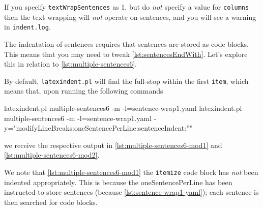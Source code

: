  If you specify \texttt{textWrapSentences} as 1, but do \emph{not} specify a value for
 \texttt{columns} then the text wrapping will \emph{not} operate on sentences, and you
 will see a warning in \texttt{indent.log}.

 \begin{example}
 The indentation of sentences requires that sentences are stored as code blocks. This
 means that you may need to tweak \vref{lst:sentencesEndWith}. Let's explore this in
 relation to \cref{lst:multiple-sentences6}.


 By default, \texttt{latexindent.pl} will find the full-stop within the first
 \texttt{item}, which means that, upon running the following commands   

 \begin{commandshell}
latexindent.pl multiple-sentences6 -m -l=sentence-wrap1.yaml 
latexindent.pl multiple-sentences6 -m -l=sentence-wrap1.yaml -y="modifyLineBreaks:oneSentencePerLine:sentenceIndent:''"
\end{commandshell}

 we receive the respective output in \cref{lst:multiple-sentences6-mod1} and
 \cref{lst:multiple-sentences6-mod2}.



 We note that \cref{lst:multiple-sentences6-mod1} the \texttt{itemize} code block has
 \emph{not} been indented appropriately. This is because the oneSentencePerLine has been
 instructed to store sentences (because \cref{lst:sentence-wrap1-yaml}); each sentence is
 then searched for code blocks.
 \end{example}

